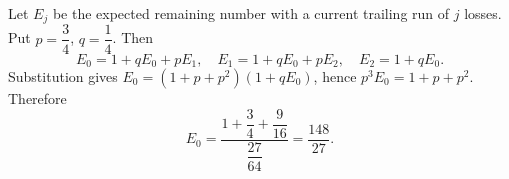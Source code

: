 Let $E_j$ be the expected remaining number with a current trailing run of $j$ losses. Put $p=\dfrac{3}{4}$, $q=\dfrac{1}{4}$. Then
\[E_0=1+qE_0+pE_1,\quad E_1=1+qE_0+pE_2,\quad E_2=1+qE_0.\]
Substitution gives $E_0=(1+p+p^2)(1+qE_0)$, hence $p^3E_0=1+p+p^2$. Therefore
\[E_0=\dfrac{1+\dfrac{3}{4}+\dfrac{9}{16}}{\dfrac{27}{64}}=\boxed{\dfrac{148}{27}}.\]
